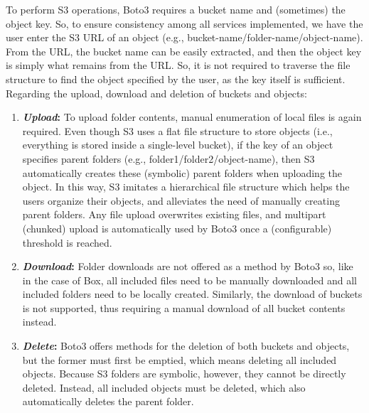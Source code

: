 To perform S3 operations, Boto3 requires a bucket name and (sometimes) the object key. So, to ensure consistency among all services implemented, we have the user enter the S3 URL of an object (e.g., bucket-name/folder-name/object-name). From the URL, the bucket name can be easily extracted, and then the object key is simply what remains from the URL. So, it is not required to traverse the file structure to find the object specified by the user, as the key itself is sufficient. Regarding the upload, download and deletion of buckets and objects: ~\cite{s3_docs}

 \begin{enumerate}
     \item \textbf{\textit{Upload}:} To upload folder contents, manual enumeration of local files is again required. Even though S3 uses a flat file structure to store objects (i.e., everything is stored inside a single-level bucket), if the key of an object specifies parent folders (e.g., folder1/folder2/object-name), then S3 automatically creates these (symbolic) parent folders when uploading the object. In this way, S3 imitates a hierarchical file structure which helps the users organize their objects, and alleviates the need of manually creating parent folders. Any file upload overwrites existing files, and multipart (chunked) upload is automatically used by Boto3 once a (configurable) threshold is reached.

     \item \textbf{\textit{Download}:} Folder downloads are not offered as a method by Boto3 so, like in the case of Box, all included files need to be manually downloaded and all included folders need to be locally created. Similarly, the download of buckets is not supported, thus requiring a manual download of all bucket contents instead.

     \item \textbf{\textit{Delete}:} Boto3 offers methods for the deletion of both buckets and objects, but the former must first be emptied, which means deleting all included objects. Because S3 folders are symbolic, however, they cannot be directly deleted. Instead, all included objects must be deleted, which also automatically deletes the parent folder.
 \end{enumerate}